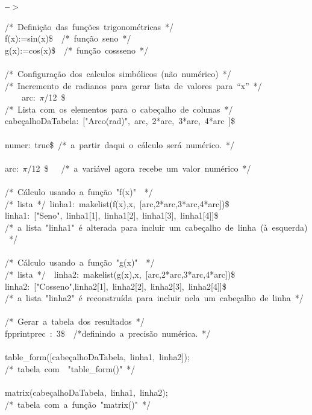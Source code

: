 \documentclass[fleqn]{article}
\begin{document}
\noindent
\begin{minipage}[t]{4.000000em}\color{red}\bfseries
 --\ensuremath{\ensuremath{>}}	
\end{minipage}
\begin{minipage}[t]{\textwidth}\color{blue}
/*\ Definição\ das\ funções\ trigonométricas\ */\ \ \\
f(x):=sin(x)\$\ \ /*\ função\ seno\ */\\
g(x):=cos(x)\$\ \ /*\ função\ cossseno\ */\\
\\
/*\ Configuração\ dos\ calculos\ simbólicos\ (não\ numérico)\ */\\
/*\ Incremento\ de\ radianos\ para\ gerar\ lista\ de\ valores\ para\ “x”\ */\ \\
\ \ \ \ arc:\ \ensuremath{\pi}/12\ \$\\
/*\ Lista\ com\ os\ elementos\ para\ o\ cabeçalho\ de\ colunas\ */\\
cabeçalhoDaTabela:\ ["Arco(rad)",\ arc,\ 2*arc,\ 3*arc,\ 4*arc\ ]\$\\
\ \ \ \ \\
numer:\ true\$\ /*\ a\ partir\ daqui\ o\ cálculo\ será\ numérico.\ */\ \\
\\
arc:\ \ensuremath{\pi}/12\ \$\ \ \ /*\ a\ variável\ agora\ recebe\ um\ valor\ numérico\ */\\
\\
/*\ Cálculo\ usando\ a\ função\ "f(x)"\ \ */\\
/*\ lista\ */\ linha1:\ makelist(f(x),x,\ [arc,2*arc,3*arc,4*arc])\$\\
linha1:\ ["Seno",\ linha1[1],\ linha1[2],\ linha1[3],\ linha1[4]]\$\\
/*\ a\ lista\ "linha1"\ é\ alterada\ para\ incluir\ um\ cabeçalho\ de\ linha\ (à\ esquerda)\ */\\
\\
/*\ Cálculo\ usando\ a\ função\ "g(x)"\ \ */\\
/*\ lista\ */\ \ linha2:\ makelist(g(x),x,\ [arc,2*arc,3*arc,4*arc])\$\\
linha2:\ ["Cosseno",linha2[1],\ linha2[2],\ linha2[3],\ linha2[4]]\$\\
/*\ a\ lista\ "linha2"\ é\ reconstruída\ para\ incluir\ nela\ um\ cabeçalho\ de\ linha\ */\\
\\
/*\ Gerar\ a\ tabela\ dos\ resultados\ */\\
fpprintprec\ :\ 3\$\ \ /*definindo\ a\ precisão\ numérica.\ */\ \ \ \ \ \\
\ \\
table\_form([cabeçalhoDaTabela,\ linha1,\ linha2]);\\
/*\ tabela\ com\ \ "table\_form()"\ */\\
\ \\
matrix(cabeçalhoDaTabela,\ linha1,\ linha2);\ \\
/*\ tabela\ com\ a\ função\ "matrix()"\ */
\end{minipage}

\noindent%
\end{document}
